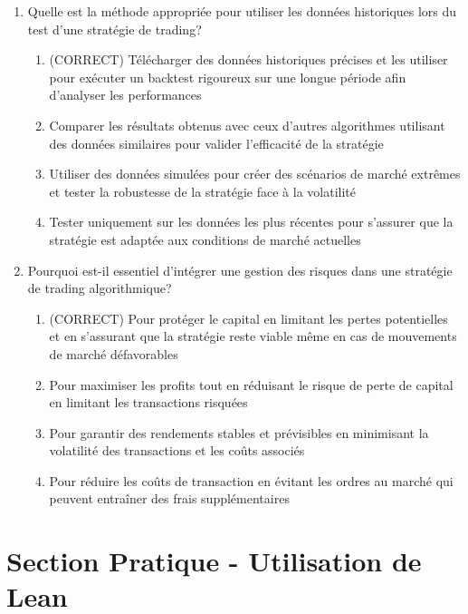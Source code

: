 \documentclass[a4paper,12pt]{article}
\begin{document}
\begin{enumerate}
    \item Quelle est la méthode appropriée pour utiliser les données historiques lors du test d'une stratégie de trading?
    \begin{enumerate}[label=(\Alph*)]
        \item (CORRECT) Télécharger des données historiques précises et les utiliser pour exécuter un backtest rigoureux sur une longue période afin d'analyser les performances
        \item Comparer les résultats obtenus avec ceux d'autres algorithmes utilisant des données similaires pour valider l'efficacité de la stratégie
        \item Utiliser des données simulées pour créer des scénarios de marché extrêmes et tester la robustesse de la stratégie face à la volatilité
        \item Tester uniquement sur les données les plus récentes pour s'assurer que la stratégie est adaptée aux conditions de marché actuelles
    \end{enumerate}

    \item Pourquoi est-il essentiel d'intégrer une gestion des risques dans une stratégie de trading algorithmique?
    \begin{enumerate}[label=(\Alph*)]
        \item (CORRECT) Pour protéger le capital en limitant les pertes potentielles et en s'assurant que la stratégie reste viable même en cas de mouvements de marché défavorables
        \item Pour maximiser les profits tout en réduisant le risque de perte de capital en limitant les transactions risquées
        \item Pour garantir des rendements stables et prévisibles en minimisant la volatilité des transactions et les coûts associés
        \item Pour réduire les coûts de transaction en évitant les ordres au marché qui peuvent entraîner des frais supplémentaires
    \end{enumerate}

\end{enumerate}

\newpage

\section*{Section Pratique - Utilisation de Lean}
\end{document}
